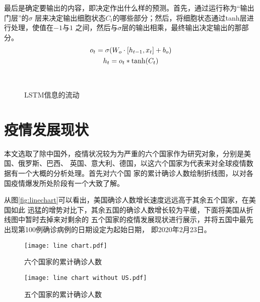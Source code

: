 \documentclass[lang=cn,11pt,a4paper,cite=authoryear]{elegantpaper}
\begin{document}
最后是确定要输出的内容，即决定作出什么样的预测。首先，通过运行称为“输出门层”的$\sigma$
层来决定输出细胞状态$C_t$的哪些部分；然后，将细胞状态通过tanh层进行处理，使值在$-1$与$1$
之间，然后与$\sigma$层的输出相乘，最终输出决定输出的那部分。
\begin{gather}
o_t=\sigma(W_o \cdot [h_{t-1},x_t]+b_o) \\
h_t=o_t*{\rm tanh}(C_t)
\end{gather}

\begin{figure}[htp]
	\centering
	\\
    \caption{LSTM信息的流动}
	\label{fig:LSTM}
\end{figure}

\section{疫情发展现状}

本文选取了除中国外，疫情状况较为为严重的六个国家作为研究对象，分别是美国、俄罗斯、巴西、
英国、意大利、德国，以这六个国家为代表来对全球疫情数据有一个大概的分析处理。首先对六个国
家的累计确诊人数绘制折线图，以对各国疫情爆发所处阶段有一个大致了解。

从图\ref{fig:linechart}可以看出，美国确诊人数增长速度远远高于其余五个国家，在美国如此
迅猛的增势对比下，其余五国的确诊人数增长较为平缓，下面将美国从折线图中暂时去掉来对剩余的
五个国家的疫情发展现状进行展示，并将五国中最先出现第100例确诊病例的日期设定为起始日期，
即2020年2月23日。

\begin{figure}[htp]
	\centering
		\begin{minipage}{0.48\linewidth}
			\centering
			\texttt{[image: line chart.pdf]}
			\caption{六个国家的累计确诊人数}
			\label{fig:linechart}
		\end{minipage}
		\begin{minipage}{0.48\linewidth}
			\centering
			\texttt{[image: line chart without US.pdf]}
			\caption{五个国家的累计确诊人数}
			\label{fig:noUS}
		\end{minipage}
\end{figure}
\end{document}
